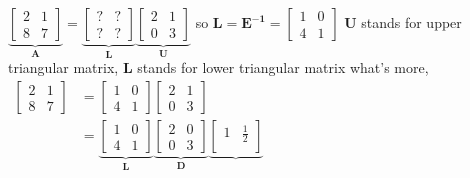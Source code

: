 \documentclass[12pt, a4paper]{article}
\begin{document}
{\begin{math}
	\underbrace{
		\begin{bmatrix}
			2 & 1 \\
			8 & 7 
		\end{bmatrix}
	}_{\mathbf{A}}
	 = 
	\underbrace{
		\begin{bmatrix}
			? & ? \\
			? & ?
		\end{bmatrix}
	}_{\mathbf{L}}
	\underbrace{
		\begin{bmatrix}
			2 & 1 \\
			0 & 3
		\end{bmatrix}
	}_{\mathbf{U}}
\end{math}
\newline
so 
\begin{math}
	{\mathbf{L}} = {\mathbf{E^{-1}}} = 
	\begin{bmatrix}
		1 & 0 \\
		4 & 1
	\end{bmatrix}
\end{math}
\newline
{\textcolor{anhao-purple}{${\mathbf{U}}$ stands for upper triangular matrix, ${\mathbf{L}}$ stands for lower triangular matrix}}
\vspace{14pt}
\newline
what's more, 
\newline
\begin{math}
	\begin{aligned}
		\begin{bmatrix}
			2 & 1 \\
			8 & 7
		\end{bmatrix}
		&=
		\begin{bmatrix}
			1 & 0 \\
			4 & 1
		\end{bmatrix}
		\begin{bmatrix}
			2 & 1 \\
			0 & 3
		\end{bmatrix}
		\\
		&=
		\underbrace{
			\begin{bmatrix}
				1 & 0 \\
				4 & 1
			\end{bmatrix}
		}_{\mathbf{L}}
		\underbrace{
			\begin{bmatrix}
				2 & 0 \\
				0 & 3
			\end{bmatrix}
		}_{\mathbf{D}}
		\underbrace{
			\begin{bmatrix}
				1 & \frac{1}{2} \\

\end{bmatrix}}
\end{aligned}
\end{math}}
\end{document}
